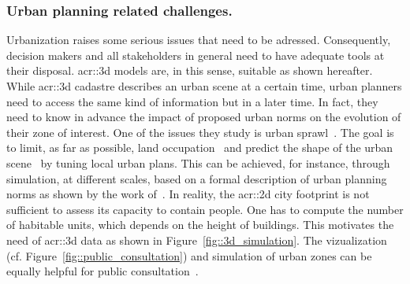         \subsubsection{Urban planning related challenges.}
            Urbanization raises some serious issues that need to be adressed.
            Consequently, decision makers and all stakeholders in general need to have adequate tools at their disposal.
            \gls{acr::3d} models are, in this sense, suitable as shown hereafter.\\
            While \gls{acr::3d} cadastre describes an urban scene at a certain time, urban planners need to access the same kind of information but in a later time.
            In fact, they need to know in advance the impact of proposed urban norms on the evolution of their zone of interest. 
            One of the issues they study is urban sprawl~\parencite{ludlow2006urban}.
            The goal is to limit, as far as possible, land occupation~\parencite{tannier2012assessing} and predict the shape of the urban scene~\parencite{brasebin20183d} by tuning local urban plans.
            This can be achieved, for instance, through simulation, at different scales, based on a formal description of urban planning norms as shown by the work of~\textcite{colomb2017simulation}.
            In reality, the \gls{acr::2d} city footprint is not sufficient to assess its capacity to contain people.
            One has to compute the number of habitable units, which depends on the height of buildings.
            This motivates the need of \gls{acr::3d} data as shown in Figure~\ref{fig::3d_simulation}.
            The  vizualization (cf. Figure~\ref{fig::public_consultation}) and simulation of urban zones can be equally helpful for public consultation~\parencite{wu2010virtual}.\\

